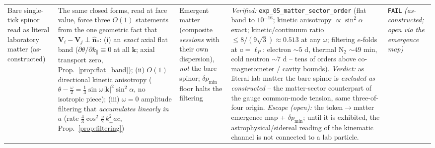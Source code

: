{\begin{longtable}{@{}p{2.6cm}p{3.8cm}p{3.2cm}p{4.4cm}p{1.0cm}@{}}
Bare single-tick spinor read as literal laboratory matter (as-constructed)
    & The same closed forms, read at face value, force three $O(1)$ statements from the one geometric fact that $\mathbf{V}_i-\mathbf{V}_j \perp \hat{\mathbf{n}}_*$: (i) an \emph{exact} axial flat band ($\partial\theta/\partial k_\parallel\equiv0$ at all $\mathbf{k}$; axial transport zero, Prop.~\ref{prop:flat_band}); (ii) $O(1)$ directional kinetic anisotropy ($\theta-\tfrac\omega2 = \tfrac13\sin\omega|\mathbf{k}|^2\sin^2\!\alpha$, no isotropic piece); (iii) $\omega=0$ amplitude filtering that \emph{accumulates linearly in $a$} (rate $\tfrac43\cos^2\!\tfrac\omega2\,k_\perp^2 a c$, Prop.~\ref{prop:filtering})
    & Emergent matter (composite \emph{sessions} with their own dispersion), \emph{not} the bare spinor; $\delta p_\text{min}$ floor halts the filtering
    & \emph{Verified:} \texttt{exp\_05\_matter\_sector\_order} (flat band to $10^{-16}$; kinetic anisotropy $\propto\sin^2\!\alpha$ exact; kinetic/continuum ratio $\le 8/(9\sqrt3)\approx0.513$ at any $\omega$; filtering $e$-folds at $a{=}\ell_P$: electron $\sim5$ d, thermal $\mathrm{N}_2$ $\sim49$ min, cold neutron $\sim7$ d -- tens of orders above co-magnetometer / cavity bounds). \emph{Verdict:} as literal lab matter the bare spinor is \emph{excluded as constructed} -- the matter-sector counterpart of the gauge common-mode tension, same three-of-four origin. \emph{Escape (open):} the token$\to$matter emergence map + $\delta p_\text{min}$; until it is exhibited, the astrophysical/sidereal reading of the kinematic channel is not connected to a lab particle.
    & \texttt{FAIL} \emph{(as-constructed; open via the emergence map)} \\


\end{longtable}}
